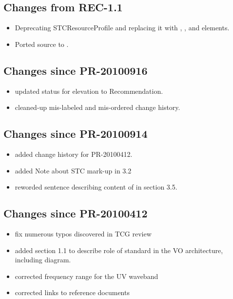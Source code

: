\documentclass[11pt,a4paper]{ivoa}
\begin{document}
\subsection{Changes from REC-1.1}

\begin{itemize}
\item Deprecating STCResourceProfile and replacing it with
, , and  elements.
\item Ported source to \ivoatex.
\end{itemize}

\subsection{Changes since PR-20100916}

\begin{itemize}
  \item updated status for elevation to Recommendation.
  \item cleaned-up mis-labeled and mis-ordered change history.
\end{itemize}

\subsection{Changes since PR-20100914}

\begin{itemize}
  \item added change history for PR-20100412.
  \item added Note about STC mark-up in 3.2
  \item reworded sentence describing content of  in
       section 3.5.
\end{itemize}

\subsection{Changes since PR-20100412}

\begin{itemize}
  \item fix numerous typos discovered in TCG review
  \item added section 1.1 to describe role of standard in the VO
       architecture, including diagram.
  \item corrected frequency range for the UV waveband
  \item corrected links to reference documents
\end{itemize}
\end{document}
